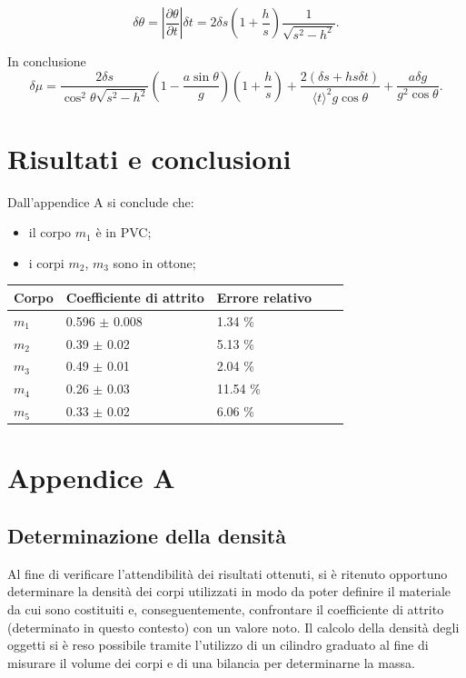 \documentclass[11pt,a4paper]{article}
\begin{document}
\begin{equation}
    \delta \theta = \left | \frac{\partial \theta}{\partial t} \right | \delta t = 2 \delta s \left ( 1+\frac{h}{s} \right ) \frac{1}{\sqrt{s^2-h^2}}.
\end{equation}

In conclusione 
\begin{equation}
    \delta \mu = \frac{2\delta s}{\cos^2 \theta \sqrt{s^2-h^2}}\left ( 1- \frac{a \sin \theta}{g} \right ) \left ( 1+ \frac{h}{s}\right ) + \frac{2(\delta s + hs\delta t)}{\langle t \rangle ^2 g \cos \theta} + \frac{a \delta g}{g^2 \cos \theta}.
\end{equation}

\section{Risultati e conclusioni}

Dall'appendice A si conclude che:
\begin{itemize}
    \item il corpo $m_1$ è in PVC;
    \item i corpi $m_2$, $m_3$ sono in ottone;
\end{itemize}

\begin{longtable}[]{@{}lllll@{}}
\toprule
Corpo & Coefficiente di attrito & Errore relativo \tabularnewline
\midrule
\endhead
$m_1$ & 0.596 $\pm$ 0.008 & 1.34 \% \tabularnewline
$m_2$ & 0.39 $\pm$ 0.02 & 5.13 \% \tabularnewline
$m_3$ & 0.49 $\pm$ 0.01 & 2.04 \% \tabularnewline
$m_4$ & 0.26 $\pm$ 0.03 & 11.54 \% \tabularnewline
$m_5$ & 0.33 $\pm$ 0.02 & 6.06 \% \tabularnewline
\bottomrule
\end{longtable}

\section{Appendice A}
\subsection{Determinazione della densità}
Al fine di verificare l'attendibilità dei risultati ottenuti, si è ritenuto opportuno determinare la densità dei corpi utilizzati in modo da poter definire il materiale da cui sono costituiti e, conseguentemente, confrontare il coefficiente di attrito (determinato in questo contesto) con un valore noto.
Il calcolo della densità degli oggetti si è reso possibile tramite l'utilizzo di un cilindro graduato al fine di misurare il volume dei corpi e di una bilancia per determinarne la massa.
\end{document}
